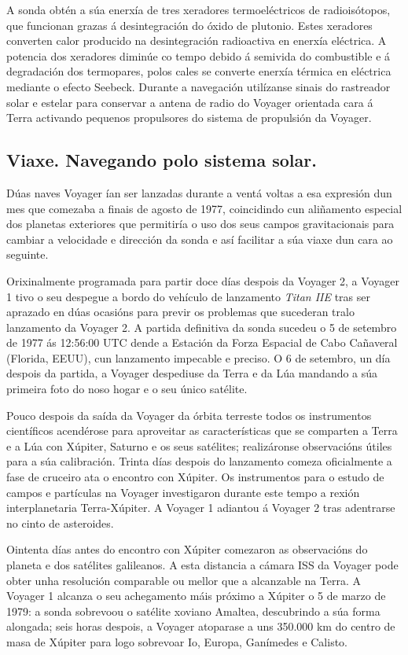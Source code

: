 \begin{refsection}
\begin{multicols}{2}
A sonda obtén a súa enerxía de tres xeradores termoeléctricos de radioisótopos,
que funcionan grazas á desintegración do óxido de plutonio. Estes xeradores
converten calor producido na desintegración radioactiva en enerxía eléctrica. A
potencia dos xeradores diminúe co tempo debido á semivida do combustible e á
degradación dos termopares, polos cales se converte enerxía térmica en
eléctrica mediante o efecto Seebeck. Durante a navegación utilízanse sinais do
rastreador solar e estelar para conservar a antena de radio do Voyager
orientada cara á Terra activando pequenos propulsores do sistema de propulsión
da Voyager.

\subsection*{Viaxe. Navegando polo sistema solar.}

Dúas naves Voyager ían ser lanzadas durante a ventá %
voltas a esa expresión dun mes que comezaba a finais de agosto de 1977,
coincidindo cun aliñamento especial  dos planetas exteriores que permitiría o
uso dos seus campos gravitacionais para cambiar a velocidade e dirección da
sonda e así facilitar a súa viaxe dun cara ao seguinte.

Orixinalmente programada para partir doce días despois da Voyager 2, a Voyager
1 tivo o seu despegue a bordo do vehículo de lanzamento \textit{Titan IIE} tras
ser aprazado en dúas ocasións para previr os problemas que sucederan tralo
lanzamento da Voyager 2. A partida definitiva da sonda sucedeu o 5 de setembro
de 1977 ás 12:56:00 UTC dende a Estación da Forza Espacial de Cabo Cañaveral
(Florida, EEUU), cun lanzamento impecable e preciso. O 6 de setembro, un día
despois da partida, a Voyager despediuse da Terra e da Lúa mandando a súa
primeira foto do noso hogar e o seu único satélite.

Pouco despois da saída da Voyager da órbita terreste todos os instrumentos
científicos acendérose para aproveitar as características que se comparten a
Terra e a Lúa con Xúpiter, Saturno e os seus satélites; realizáronse
observacións útiles para a súa calibración. Trinta días despois do lanzamento
comeza oficialmente a fase de cruceiro ata o encontro con Xúpiter. Os
instrumentos para o estudo de campos e partículas na Voyager investigaron
durante este tempo a rexión interplanetaria Terra-Xúpiter. A Voyager 1 adiantou
á Voyager 2 tras adentrarse no cinto de asteroides.

Ointenta días antes do encontro con Xúpiter comezaron as observacións do
planeta e dos satélites galileanos. A esta distancia a cámara ISS da Voyager
pode obter unha resolución comparable ou mellor que a alcanzable na Terra. A
Voyager 1 alcanza o seu achegamento máis próximo a Xúpiter o 5 de marzo de
1979: a sonda sobrevoou o satélite xoviano Amaltea, descubrindo a súa forma
alongada; seis horas despois, a Voyager atoparase a uns 350.000 km do centro de
masa de Xúpiter para logo sobrevoar Io, Europa, Ganímedes e Calisto.


\end{multicols}
\end{refsection}
